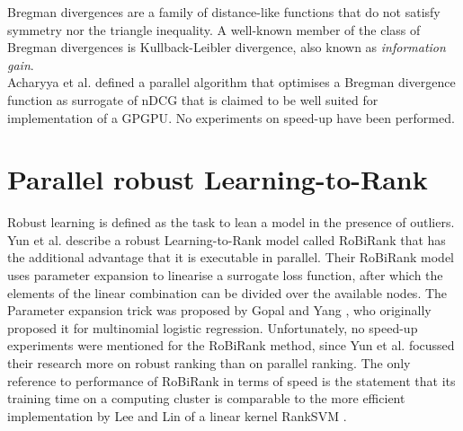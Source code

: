 Bregman divergences are a family of distance-like functions that do not satisfy symmetry nor the triangle inequality. A well-known member of the class of Bregman divergences is Kullback-Leibler divergence, also known as \emph{information gain}.\\

Acharyya et al. \cite{Acharyya2012} defined a parallel algorithm that optimises a Bregman divergence function as surrogate of \ac{nDCG} that is claimed to be well suited for implementation of a \ac{GPGPU}. No experiments on speed-up have been performed.
\section{Parallel robust Learning-to-Rank}
Robust learning \cite{Huber1981} is defined as the task to lean a model in the presence of outliers. Yun et al. describe a \cite{Yun2014} robust Learning-to-Rank model called RoBiRank that has the additional advantage that it is executable in parallel. Their RoBiRank model uses parameter expansion to linearise a surrogate loss function, after which the elements of the linear combination can be divided over the available nodes. The Parameter expansion trick was proposed by Gopal and Yang \cite{Gopal2013}, who originally proposed it for multinomial logistic regression. Unfortunately, no speed-up experiments were mentioned for the RoBiRank method, since Yun et al. focussed their research more on robust ranking than on parallel ranking. The only reference to performance of RoBiRank in terms of speed is the statement that its training time on a computing cluster is comparable to the more efficient implementation by Lee and Lin \cite{Lee2014} of a linear kernel RankSVM \cite{Herbrich1999, Joachims2002}.
